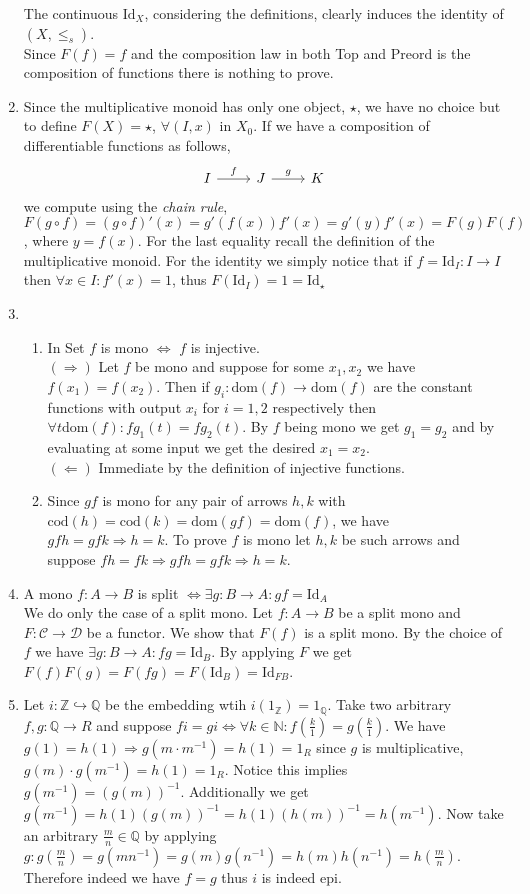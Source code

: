 \documentclass[11pt]{article}
\theoremstyle{plain}
\theoremstyle{definition}
\theoremstyle{remark}
\newcommand{\cC}{\mathcal{C}}
\newcommand{\cD}{\mathcal{D}}
\newcommand{\dom}{\mathrm{dom}}
\newcommand{\cod}{\mathrm{cod}}
\begin{document}
\begin{exercises}
\begin{enumerate}
 The continuous $\text{Id}_X$, considering the definitions, clearly induces the identity of $(X, \leq_s)$.\\
 Since $F(f)=f$ and the composition law in both Top and Preord is the composition of functions there is nothing to prove.
\item Since the multiplicative monoid has only one object, $\star$, we have no choice but to define $F(X)=\star$, $\forall (I,x)$ in $X_0$. If we have a composition of differentiable functions as follows,
\[\begin{tikzcd}
	{I} & {J} & {K}
	\arrow["{f}", from=1-1, to=1-2]
	\arrow["{g}", from=1-2, to=1-3]
\end{tikzcd}\]
we compute using the \textit{chain rule}, $F(g \circ f)=(g \circ f)'(x)=g'(f(x)) f'(x)=g'(y)f'(x)=F(g)F(f)$, where $y=f(x)$. For the last equality recall the definition of the multiplicative monoid. For the identity we simply notice that if $f=\text{Id}_I:I \to I$ then $\forall x \in I: f'(x)=1$, thus $F(\text{Id}_I)=1=\text{Id}_{\star}$
\item 
\begin{enumerate}
\item In Set $f$ is mono $\iff$ $f$ is injective.\\ $(\Rightarrow)$ Let $f$ be mono and suppose for some $x_1,x_2$ we have $f(x_1)=f(x_2)$. Then if $g_i:\dom(f) \to \dom(f)$ are the constant functions with output $x_i$ for $i=1,2$ respectively then  $\forall t \dom(f): fg_1(t)=fg_2(t)$. By $f$ being mono we get $g_1=g_2$ and by evaluating at some input we get the desired $x_1=x_2$.\\
$(\Leftarrow)$ Immediate by the definition of injective functions.
\item Since $gf$ is mono for any pair of arrows $h,k$ with $\cod(h)=\cod(k)=\dom(gf)=\dom(f)$, we have $gfh=gfk \Rightarrow h=k$. To prove $f$ is mono let $h,k$ be such arrows and suppose $fh=fk \Rightarrow gfh=gfk \Rightarrow h=k$.
\end{enumerate}
\item A mono $f:A \to B$ is split $\iff \exists g:B \to A: gf=\text{Id}_A$\\
We do only the case of a split mono. Let $f:A \to B$ be a split mono and $F:\cC \to \cD$ be a functor. We show that $F(f)$ is a split mono. By the choice of $f$ we have $\exists g:B \to A: fg=\text{Id}_B$. By applying $F$ we get $F(f)F(g)=F(fg)=F(\text{Id}_B)=\text{Id}_{FB}$.
\item Let $i:\mathbb{Z} \hookrightarrow \mathbb{Q}$ be the embedding wtih $i(1_{\mathbb{Z}})=1_{\mathbb{Q}}$. Take two arbitrary $f,g:\mathbb{Q} \to R$ and suppose $fi=gi \iff \forall k \in \mathbb{N}: f(\frac{k}{1})=g(\frac{k}{1})$. We have $g(1)=h(1) \Rightarrow g(m\cdot m^{-1})=h(1)=1_R$ since $g$ is multiplicative, $g(m)\cdot g(m^{-1})=h(1)=1_R$. Notice this implies $g(m^{-1})=(g(m))^{-1}$. Additionally we get $g(m^{-1})=h(1) (g(m))^{-1}=h(1)(h(m))^{-1}=h(m^{-1})$. Now take an arbitrary $\frac{m}{n} \in \mathbb{Q}$ by applying $g: g(\frac{m}{n})=g(mn^{-1})=g(m)g(n^{-1})=h(m)h(n^{-1})=h(\frac{m}{n})$. Therefore indeed we have  $f=g$ thus $i$ is indeed epi.

\end{enumerate}
\end{exercises}
\end{document}
